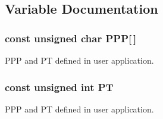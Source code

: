 \subsection{Variable Documentation}
\subsubsection{\setlength{\rightskip}{0pt plus 5cm}const unsigned char {\bf PPP}[$\,$]}\label{os_8c_9139cb65cf60e47afed151765972c100}


PPP and PT defined in user application. 
\subsubsection{\setlength{\rightskip}{0pt plus 5cm}const unsigned int {\bf PT}}\label{os_8c_6370d00b2f49ebb4a69edf643003ada2}


PPP and PT defined in user application. 